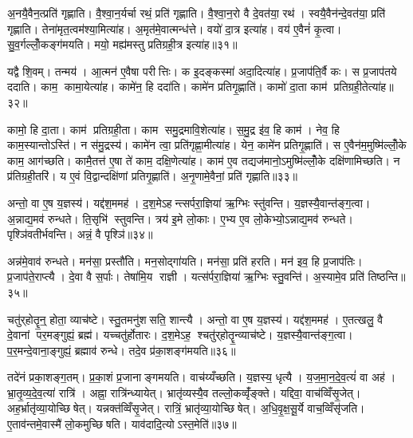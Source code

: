 अ॒नयै॒वैन॒त्प्रति॑ गृह्णाति। वै॒श्वा॒न॒र्यर्चा रथं॒ प्रति॑ गृह्णाति। वै॒श्वा॒न॒रो वै दे॒वत॑या॒ रथ॑। स्वयै॒वैन॑न्दे॒वत॑या॒ प्रति॑ गृह्णाति। तेना॑मृत॒त्वम॑श्या॒मित्या॑ह। अ॒मृत॑मे॒वात्मन्ध॑त्ते। वयो॑ दा॒त्र इत्या॑ह। वय॑ ए॒वैनं॑ कृ॒त्वा। सु॒व॒र्गल्लोँ॒कङ्ग॑मयति। मयो॒ मह्य॑मस्तु प्रतिग्रही॒त्र इत्या॑ह॥३१॥

यद्वै शि॒वम्। तन्मय॑। आ॒त्मन॑ ए॒वैषा परीत्तिः। क इ॒दङ्कस्मा॑ अदा॒दित्या॑ह। प्र॒जाप॑ति॒र्वै कः। स प्र॒जाप॑तये ददाति। काम॒ कामा॒येत्या॑ह। कामे॑न॒ हि ददा॑ति। कामे॑न प्रतिगृ॒ह्णाति॑। कामो॑ दा॒ता काम॑ प्रतिग्रही॒तेत्या॑ह॥३२॥

कामो॒ हि दा॒ता। काम॑ प्रतिग्रही॒ता। काम समु॒द्रमावि॒शेत्या॑ह। स॒मु॒द्र इ॑व॒ हि काम॑। नेव॒ हि काम॒स्यान्तोऽस्ति॑। न स॑मु॒द्रस्य॑। कामे॑न त्वा॒ प्रति॑गृह्णा॒मीत्या॑ह। येन॒ कामे॑न प्रतिगृ॒ह्णाति॑। स ए॒वैन॑म॒मुष्मि॑ल्लोँ॒के काम॒ आग॑च्छति। कामै॒तत्त॑ ए॒षा ते॑ काम॒ दक्षि॒णेत्या॑ह। काम॑ ए॒व तद्यज॑मानो॒ऽमुष्मि॑ल्लोँ॒के दक्षि॑णामिच्छति। न प्र॑तिग्रही॒तरि॑। य ए॒वं वि॒द्वान्दक्षि॑णां प्रतिगृ॒ह्णाति॑। अ॒नृ॒णामे॒वैनां॒ प्रति॑ गृह्णाति॥३३॥\anuvakamend[व्ली॒ना॒त्यश्व॒मित्या॑हाङ्गीर॒सः प्र॑तिग्रही॒त्र इत्या॑ह प्रतिग्रही॒तेत्या॑ह॒ दक्षि॒णेत्या॑ह च॒त्वारि॑ च]

अन्तो॒ वा ए॒ष य॒ज्ञस्य॑। यद्द॑श॒ममह॑। द॒श॒मेऽहन्त्सर्परा॒ज्ञिया॑ ऋ॒ग्भिः स्तु॑वन्ति। य॒ज्ञस्यै॒वान्त॑ङ्ग॒त्वा। अ॒न्नाद्य॒मव॑ रुन्धते। ति॒सृभि॑ स्तुवन्ति। त्रय॑ इ॒मे लो॒काः। ए॒भ्य ए॒व लो॒केभ्यो॒ऽन्नाद्य॒मव॑ रुन्धते। पृश्ञि॑वतीर्भवन्ति। अन्नं॒ वै पृश्ञि॑॥३४॥

अन्न॑मे॒वाव॑ रुन्धते। मन॑सा॒ प्रस्तौ॑ति। मन॒सोद्गा॑यति। मन॑सा॒ प्रति॑ हरति। मन॑ इव॒ हि प्र॒जाप॑तिः। प्र॒जाप॑ते॒राप्त्यै। दे॒वा वै स॒र्पाः। तेषा॑मि॒य राज्ञी। यत्स॑र्परा॒ज्ञिया॑ ऋ॒ग्भिः स्तु॒वन्ति॑। अ॒स्यामे॒व प्रति॑ तिष्ठन्ति॥३५॥

चतु॑र्‌होतॄ॒न्॒ होता॒ व्याच॑ष्टे। स्तु॒तमनु॑शसति॒ शान्त्यै। अन्तो॒ वा ए॒ष य॒ज्ञस्य॑। यद्द॑श॒ममह॑। ए॒तत्खलु॒ वै दे॒वानां पर॒मङ्गुह्यं॒ ब्रह्म॑। यच्चतु॑र्होतारः। द॒श॒मेऽह॒ श्चतु॑र्‌होतॄ॒न्व्याच॑ष्टे। य॒ज्ञस्यै॒वान्त॑ङ्ग॒त्वा। प॒र॒मन्दे॒वाना॒ङ्गुह्यं॒ ब्रह्माव॑ रुन्धे। तदे॒व प्र॑का॒शङ्ग॑मयति॥३६॥

तदे॑नं प्रका॒शङ्ग॒तम्। प्र॒का॒शं प्र॒जानाङ्गमयति। वाच॑य्यँच्छति। य॒ज्ञस्य॒ धृत्यै। य॒ज॒मा॒न॒दे॒व॒त्यं॑ वा अह॑। भ्रा॒तृ॒व्य॒दे॒व॒त्या॑ रात्रि॑। अह्ना॒ रात्रि॑न्ध्यायेत्। भ्रातृ॑व्यस्यै॒व तल्लो॒कव्वृँ॑ङ्क्ते। यद्दिवा॒ वाच॑व्विँसृ॒जेत्। अह॒र्भ्रातृ॑व्या॒योच्छिषेत्। यन्नक्त॑व्विँसृ॒जेत्। रात्रिं॒ भ्रातृ॑व्या॒योच्छिषेत्। अ॒धि॒वृ॒क्ष॒सू॒र्ये वाच॒व्विँसृ॑जति। ए॒ताव॑न्तमे॒वास्मै॑ लो॒कमुच्छिषति। याव॑दादि॒त्योऽस्त॒मेति॑॥३७॥\anuvakamend[पृश्ञि॑ तिष्ठन्ति गमयति शिषे॒त्पञ्च॑ च]

